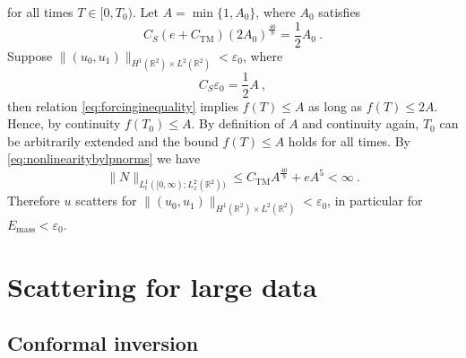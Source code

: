 \documentclass[a4paper]{amsart}
\providecommand{\norm}[1]{\lVert #1 \rVert}
\begin{document}
for all times $T \in [0,T_0)$.  Let $A = \min\{1, A_0\}$, where $A_0$ satisfies
\begin{equation*}
  C_S
  (e + C_{\textrm{TM}})
  (2 A_0)^{\frac{40}{9}}
  =
  \frac{1}{2}
  A_0
  \ .
\end{equation*}
Suppose $\norm{(u_0,u_1)}_{H^1({\mathbb{R}}^2) \times L^2({\mathbb{R}}^2)} < {\varepsilon}_0$, where
\begin{equation*}
  C_S
  {\varepsilon}_0
  =
  \frac{1}{2}
  A
  \ ,
\end{equation*}
then relation \eqref{eq:forcinginequality} implies $f(T) \leq A$ as
long as $f(T) \leq 2 A$. Hence, by continuity $f(T_0) \leq A$. By 
definition of $A$ and continuity again, $T_0$ can be arbitrarily extended
and the bound $f(T) \leq A$ holds for all times. By
\eqref{eq:nonlinearitybylpnorms} we have
\begin{equation*}
  \norm{N}_{L^1_t([0,\infty); L^2_x({\mathbb{R}}^2))}
  \leq
  C_{\textrm{TM}}
  A^{\frac{40}{9}}
  +
  e
  A^{5}
  <
  \infty\ .
\end{equation*}
Therefore $u$ scatters for $\norm{(u_0,u_1)}_{H^1({\mathbb{R}}^2) \times
L^2({\mathbb{R}}^2)} < {\varepsilon}_0$, in particular for $E_{\textrm{mass}} <
{\varepsilon}_0$.

\section{Scattering for large data}
\label{sec:largedata}
\subsection{Conformal inversion}
\end{document}
